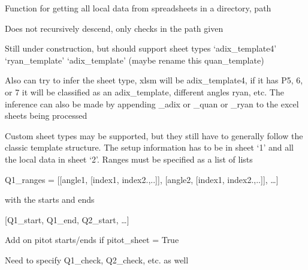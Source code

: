 \documentclass[letterpaper,10pt,english]{sphinxmanual}
\begin{document}
\begin{fulllineitems}
\label{\detokenize{api/MARIGOLD.extractLocalDataFromDir:MARIGOLD.extractLocalDataFromDir}}
\pysigstartsignatures
{}
\pysigstopsignatures
\sphinxAtStartPar
Function for getting all local data from spreadsheets in a directory, path

\sphinxAtStartPar
Does not recursively descend, only checks in the path given

\sphinxAtStartPar
Still under construction, but should support sheet types
‘adix\_template4’
‘ryan\_template’
‘adix\_template’ (maybe rename this quan\_template)

\sphinxAtStartPar
Also can try to infer the sheet type, xlsm will be adix\_template4, if it has P5, 6, or 7 it will
be classified as an adix\_template, different angles ryan, etc. The inference can also be made by
appending \_adix or \_quan or \_ryan to the excel sheets being processed

\sphinxAtStartPar
Custom sheet types may be supported, but they still have to generally follow the classic template
structure. The setup information has to be in sheet ‘1’ and all the local data in sheet ‘2’. Ranges
must be specified as a list of lists

\sphinxAtStartPar
Q1\_ranges = {[}{[}angle1, {[}index1, index2.,..{]}{]}, {[}angle2, {[}index1, index2.,..{]}{]}, …{]}

\sphinxAtStartPar
with the starts and ends

\sphinxAtStartPar
{[}Q1\_start, Q1\_end, Q2\_start, …{]}

\sphinxAtStartPar
Add on pitot starts/ends if pitot\_sheet = True

\sphinxAtStartPar
Need to specify Q1\_check, Q2\_check, etc. as well

\end{fulllineitems}
\end{document}
